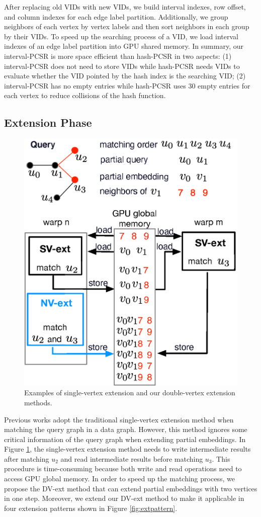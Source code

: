 After replacing old VIDs with new VIDs, we build interval indexes, row offset, and column indexes for each edge label partition. Additionally, we group neighbors of each vertex by vertex labels and then sort neighbors in each group by their VIDs. To speed up the searching process of a VID, we load interval indexes of an edge label partition into GPU shared memory. In summary, our interval-PCSR is more space efficient than hash-PCSR in two aspects: (1) interval-PCSR does not need to store VIDs while hash-PCSR needs VIDs to evaluate whether the VID pointed by the hash index is the searching VID; (2) interval-PCSR has no empty entries while hash-PCSR uses 30 empty entries for each vertex to reduce collisions of the hash function.


\subsection{Extension Phase}
\begin{figure}
\centering
\includegraphics[width=0.9\columnwidth]{./figure/doubleext.eps}
\caption{Examples of single-vertex extension and our double-vertex extension methods.}	
\label{fig:doubleext}
\end{figure}
Previous works \cite{zeng2020gsi,sun2020subgraph} adopt the traditional single-vertex extension method when matching the query graph in a data graph. However, this method ignores some critical information of the query graph when extending partial embeddings. In Figure \ref{fig:doubleext}, the single-vertex extension method needs to write intermediate results after matching $u_2$ and read intermediate results before matching $u_3$. This procedure is time-consuming because both write and read operations need to access GPU global memory. In order to speed up the matching process, we propose the DV-ext method that can extend partial embeddings with two vertices in one step. Moreover, we extend our DV-ext method to make it applicable in four extension patterns shown in Figure \ref{fig:extpattern}.
